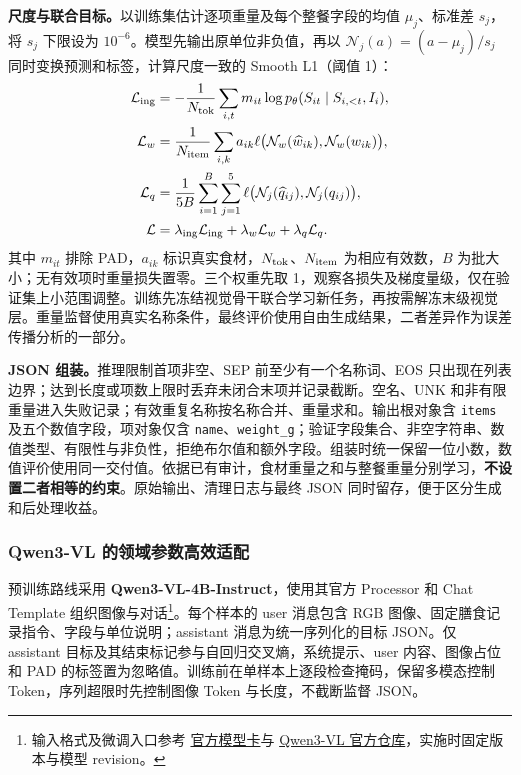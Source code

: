 \textbf{尺度与联合目标。}以训练集估计逐项重量及每个整餐字段的均值 $\mu_j$、标准差 $s_j$，将 $s_j$ 下限设为 $10^{-6}$。模型先输出原单位非负值，再以 $\mathcal N_j(a)=(a-\mu_j)/s_j$ 同时变换预测和标签，计算尺度一致的 Smooth L1（阈值 1）：
\begin{align}
 \mathcal L_{\rm ing}&=-\frac{1}{N_{\rm tok}}\sum_{i,t}m_{it}
       \log p_\theta(S_{it}\mid S_{i,<t},I_i),\notag\\
 \mathcal L_w&=\frac{1}{N_{\rm item}}\sum_{i,k}a_{ik}
   \ell\bigl(\mathcal N_w(\widehat w_{ik}),\mathcal N_w(w_{ik})\bigr),\notag\\
 \mathcal L_q&=\frac{1}{5B}\sum_{i=1}^{B}\sum_{j=1}^{5}
   \ell\bigl(\mathcal N_j(\widehat q_{ij}),\mathcal N_j(q_{ij})\bigr),\notag\\
 \mathcal L&=\lambda_{\rm ing}\mathcal L_{\rm ing}+\lambda_w\mathcal L_w+
       \lambda_q\mathcal L_q.\label{eq:fl-joint}
\end{align}
其中 $m_{it}$ 排除 PAD，$a_{ik}$ 标识真实食材，$N_{\rm tok}$、$N_{\rm item}$ 为相应有效数，$B$ 为批大小；无有效项时重量损失置零。三个权重先取 1，观察各损失及梯度量级，仅在验证集上小范围调整。训练先冻结视觉骨干联合学习新任务，再按需解冻末级视觉层。重量监督使用真实名称条件，最终评价使用自由生成结果，二者差异作为误差传播分析的一部分。

\textbf{JSON 组装。}推理限制首项非空、SEP 前至少有一个名称词、EOS 只出现在列表边界；达到长度或项数上限时丢弃未闭合末项并记录截断。空名、UNK 和非有限重量进入失败记录；有效重复名称按名称合并、重量求和。输出根对象含 \texttt{items} 及五个数值字段，项对象仅含 \texttt{name}、\texttt{weight\_g}；验证字段集合、非空字符串、数值类型、有限性与非负性，拒绝布尔值和额外字段。组装时统一保留一位小数，数值评价使用同一交付值。依据已有审计，食材重量之和与整餐重量分别学习，\textbf{不设置二者相等的约束}。原始输出、清理日志与最终 JSON 同时留存，便于区分生成和后处理收益。


\subsubsection{Qwen3-VL 的领域参数高效适配}
预训练路线采用 \textbf{Qwen3-VL-4B-Instruct}，使用其官方 Processor 和 Chat Template 组织图像与对话\footnote{输入格式及微调入口参考 \href{https://huggingface.co/Qwen/Qwen3-VL-4B-Instruct}{官方模型卡}与 \href{https://github.com/QwenLM/Qwen3-VL}{Qwen3-VL 官方仓库}，实施时固定版本与模型 revision。}。每个样本的 user 消息包含 RGB 图像、固定膳食记录指令、字段与单位说明；assistant 消息为统一序列化的目标 JSON。仅 assistant 目标及其结束标记参与自回归交叉熵，系统提示、user 内容、图像占位和 PAD 的标签置为忽略值。训练前在单样本上逐段检查掩码，保留多模态控制 Token，序列超限时先控制图像 Token 与长度，不截断监督 JSON。

